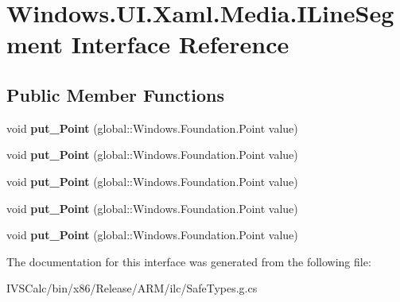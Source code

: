 \hypertarget{interface_windows_1_1_u_i_1_1_xaml_1_1_media_1_1_i_line_segment}{}\section{Windows.\+U\+I.\+Xaml.\+Media.\+I\+Line\+Segment Interface Reference}
\label{interface_windows_1_1_u_i_1_1_xaml_1_1_media_1_1_i_line_segment}
\subsection*{Public Member Functions}
\begin{DoxyCompactItemize}
\item 
\mbox{\label{interface_windows_1_1_u_i_1_1_xaml_1_1_media_1_1_i_line_segment_a467d9c57a5c6f6511de704889ac2bd69}} 
void {\bfseries put\+\_\+\+Point} (global\+::\+Windows.\+Foundation.\+Point value)
\item 
\mbox{\label{interface_windows_1_1_u_i_1_1_xaml_1_1_media_1_1_i_line_segment_a467d9c57a5c6f6511de704889ac2bd69}} 
void {\bfseries put\+\_\+\+Point} (global\+::\+Windows.\+Foundation.\+Point value)
\item 
\mbox{\label{interface_windows_1_1_u_i_1_1_xaml_1_1_media_1_1_i_line_segment_a467d9c57a5c6f6511de704889ac2bd69}} 
void {\bfseries put\+\_\+\+Point} (global\+::\+Windows.\+Foundation.\+Point value)
\item 
\mbox{\label{interface_windows_1_1_u_i_1_1_xaml_1_1_media_1_1_i_line_segment_a467d9c57a5c6f6511de704889ac2bd69}} 
void {\bfseries put\+\_\+\+Point} (global\+::\+Windows.\+Foundation.\+Point value)
\item 
\mbox{\label{interface_windows_1_1_u_i_1_1_xaml_1_1_media_1_1_i_line_segment_a467d9c57a5c6f6511de704889ac2bd69}} 
void {\bfseries put\+\_\+\+Point} (global\+::\+Windows.\+Foundation.\+Point value)
\end{DoxyCompactItemize}


The documentation for this interface was generated from the following file\+:\begin{DoxyCompactItemize}
\item 
I\+V\+S\+Calc/bin/x86/\+Release/\+A\+R\+M/ilc/Safe\+Types.\+g.\+cs\end{DoxyCompactItemize}
